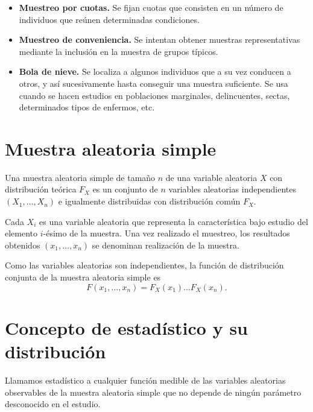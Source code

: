 \begin{itemize}
    \item \textbf{Muestreo por cuotas.}
    Se fijan cuotas que consisten en un número de individuos que reúnen determinadas condiciones.

    \item \textbf{Muestreo de conveniencia.}
    Se intentan obtener muestras representativas mediante la inclusión en la muestra de grupos típicos.

    \item \textbf{Bola de nieve.}
    Se localiza a algunos individuos que a su vez conducen a otros, y así sucesivamente hasta conseguir una muestra suficiente. Se usa cuando se hacen estudios en poblaciones marginales, delincuentes, sectas, determinados tipos de enfermos, etc.
\end{itemize}

\section{Muestra aleatoria simple}

\begin{definition}
    Una muestra aleatoria simple de tamaño $n$ de una variable aleatoria $X$ con distribución teórica $F_X$ es un conjunto de $n$ variables aleatorias independientes $(X_1, \dots, X_n)$ e igualmente distribuidas con distribución común $F_X$.
\end{definition}

Cada $X_i$ es una variable aleatoria que representa la característica bajo estudio del elemento $i$-ésimo de la muestra.
Una vez realizado el muestreo, los resultados obtenidos $(x_1, \dots, x_n)$ se denominan realización de la muestra.

Como las variables aleatorias son independientes, la función de distribución conjunta de la muestra aleatoria simple es
$$F(x_1, \dots, x_n) = F_X(x_1) \dots F_X(x_n).$$

\section{Concepto de estadístico y su distribución}

\begin{definition}
    Llamamos estadístico a cualquier función medible de las variables aleatorias observables de la muestra aleatoria simple que no depende de ningún parámetro desconocido en el estudio.
\end{definition}

